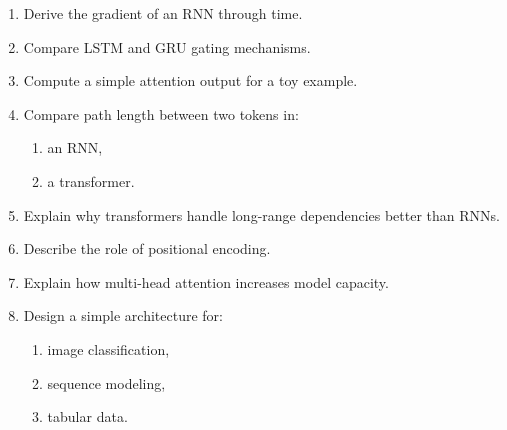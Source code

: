 \begin{enumerate}
    \item Derive the gradient of an RNN through time.

    \item Compare LSTM and GRU gating mechanisms.

    \item Compute a simple attention output for a toy example.

    \item Compare path length between two tokens in:
    \begin{enumerate}
        \item an RNN,
        \item a transformer.
    \end{enumerate}

    \item Explain why transformers handle long-range dependencies better than RNNs.

    \item Describe the role of positional encoding.

    \item Explain how multi-head attention increases model capacity.

    \item Design a simple architecture for:
    \begin{enumerate}
        \item image classification,
        \item sequence modeling,
        \item tabular data.
    \end{enumerate}
\end{enumerate}